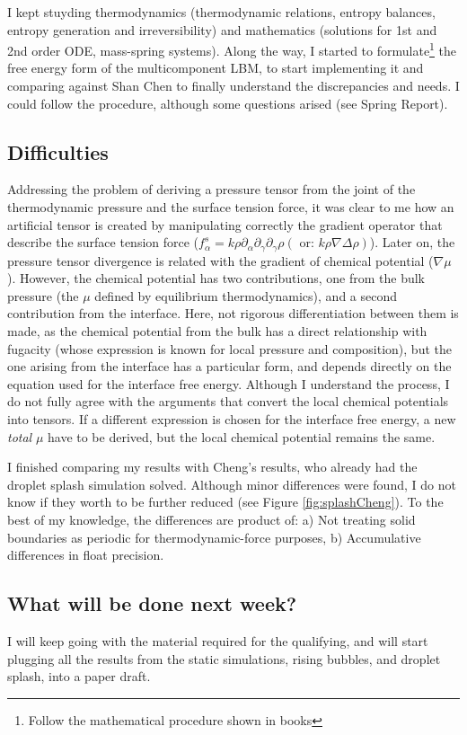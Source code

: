 \documentclass[12pt]{article}
\begin{document}
	I kept stuyding thermodynamics (thermodynamic relations, entropy balances, entropy generation and irreversibility) and mathematics (solutions for 1st and 2nd order ODE, mass-spring systems). Along the way, I started to formulate\footnote{Follow the mathematical procedure shown in books} the free energy form of the multicomponent LBM, to start implementing it and comparing against Shan Chen to finally understand the discrepancies and needs. I could follow the procedure, although some questions arised (see Spring Report). 
	

	\subsection*{Difficulties}
	Addressing the problem of deriving a pressure tensor from the joint of the thermodynamic pressure and the surface tension force, it was clear to me how an artificial tensor is created by manipulating correctly the gradient operator that describe the surface tension force ($f^s_\alpha = k \rho \partial_\alpha \partial_\gamma \partial_\gamma \rho (\text{ or: }k \rho \nabla \Delta \rho)$). Later on, the pressure tensor divergence is related with the gradient of chemical potential ($\nabla \mu$). However, the chemical potential has two contributions, one from the bulk pressure (the $\mu$ defined by equilibrium thermodynamics), and a second contribution from the interface. Here, not rigorous differentiation between them is made, as the chemical potential from the bulk has a direct relationship with fugacity (whose expression is known for local pressure and composition), but the one arising from the interface has a particular form, and depends directly on the equation used for the interface free energy. Although I understand the process, I do not fully agree with the arguments that convert the local chemical potentials into tensors. If a different expression is chosen for the interface free energy, a new \textit{total} $\mu$ have to be derived, but the local chemical potential remains the same.

	I finished comparing my results with Cheng's results, who already had the droplet splash simulation solved. Although minor differences were found, I do not know if they worth to be further reduced (see Figure \ref{fig:splashCheng}). To the best of my knowledge, the differences are product of: a) Not treating solid boundaries as periodic for thermodynamic-force purposes, b) Accumulative differences in float precision.
	

	\subsection*{What will be done next week?}
	I will keep going with the material required for the qualifying, and will start plugging all the results from the static simulations, rising bubbles, and droplet splash, into a paper draft. 
\end{document}
